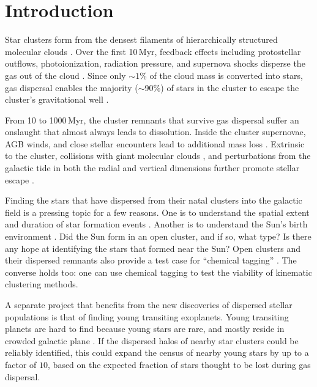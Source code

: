 \documentclass[12pt,twocolumn,tighten]{aastex63}
\begin{document}


\section{Introduction}

Star clusters form from the densest filaments of 
hierarchically structured molecular clouds
\citep{shu_star_1987}.  Over the first 10\,Myr, feedback effects
including protostellar outflows, photoionization, radiation pressure,
and supernova shocks disperse the gas out of the cloud
\citep{krumholz_star_2019}.  Since only $\sim 1\%$ of the cloud
mass is converted into stars, gas dispersal enables the
majority ($\sim$90\%) of stars in the cluster to escape the cluster's
gravitational well \citep{lada_embedded_2003}.

From 10 to 1000\,Myr, the cluster remnants that survive gas dispersal
suffer an onslaught that almost always leads to dissolution.  Inside
the cluster supernovae, AGB winds, and close stellar encounters lead
to additional mass loss \citep{lamers_mass_loss_2010}.  Extrinsic to
the cluster, collisions with giant molecular clouds
\citep{spitzer_disruption_1958}, and perturbations from the galactic
tide in both the radial and vertical dimensions further promote
stellar escape \citep[{\it
e.g.},][]{fukushige_timescale_2000,bergond_gravitational_2001}.

Finding the stars that have dispersed from their natal clusters into
the galactic field is a pressing topic for a few reasons.  One is to
understand the spatial extent and duration of star formation events
\citep[{\it e.g.},][]{wright_kinematics_2018}.  Another
is to understand the Sun's birth environment \citep{adams_birth_2010}.
Did the Sun form in an open cluster, and if so, what type? Is there
any hope at identifying the stars that formed near the Sun?  Open
clusters and their dispersed remnants also provide a test case for
``chemical tagging'' \citep[{\it
e.g.},][]{freeman_new_2002,hogg_chemical_2016,ness_dopplergangers_2018}.
The converse holds too: one can use chemical tagging to test the
viability of kinematic clustering methods.

A separate project that benefits from the new discoveries of dispersed
stellar populations is that of finding young transiting exoplanets.
Young transiting planets are hard to find because young stars are
rare, and mostly reside in crowded galactic plane \citep[see {\it
e.g.},][]{Kharchenko_et_al_2013,piskunov_global_2018}.  If the
dispersed halos of nearby star clusters could be reliably identified,
this could expand the census of nearby young stars by up to a factor
of $10$, based on the expected fraction of stars thought to be lost
during gas dispersal.
\end{document}
